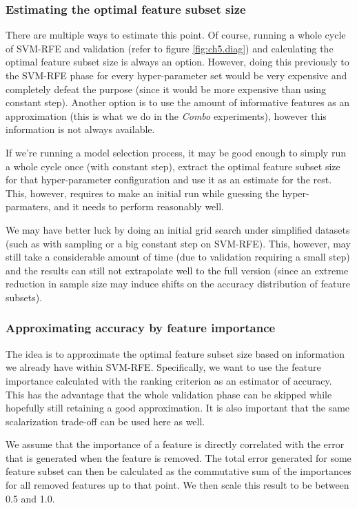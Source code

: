 \subsubsection*{Estimating the optimal feature subset size}

There are multiple ways to estimate this point. Of course, running a whole cycle of SVM-RFE and validation (refer to figure \ref{fig:ch5.diag}) and calculating the optimal feature subset size is always an option. However, doing this previously to the SVM-RFE phase for every hyper-parameter set would be very expensive and completely defeat the purpose (since it would be more expensive than using constant step). Another option is to use the amount of informative features as an approximation (this is what we do in the \emph{Combo} experiments), however this information is not always available.

If we're running a model selection process, it may be good enough to simply run a whole cycle once (with constant step), extract the optimal feature subset size for that hyper-parameter configuration and use it as an estimate for the rest. This, however, requires to make an initial run while guessing the hyper-parmaters, and it needs to perform reasonably well. 

We may have better luck by doing an initial grid search under simplified datasets (such as with sampling or a big constant step on SVM-RFE). This, however, may still take a con\-sid\-er\-able amount of time (due to validation requiring a small step) and the results can still not extrapolate well to the full version (since an extreme reduction in sample size may induce shifts on the accuracy distribution of feature subsets).

\subsubsection*{Approximating accuracy by feature importance}

The idea is to approximate the optimal feature subset size based on information we already have within SVM-RFE. Specifically, we want to use the feature importance calculated with the ranking criterion as an estimator of accuracy. This has the ad\-van\-tage that the whole validation phase can be skipped while hopefully still retaining a good approximation. It is also important that the same scalarization trade-off can be used here as well.

We assume that the importance of a feature is directly correlated with the error that is generated when the feature is removed. The total error generated for some feature subset can then be calculated as the commutative sum of the im\-por\-tances for all removed features up to that point. We then scale this result to be between 0.5 and 1.0.

